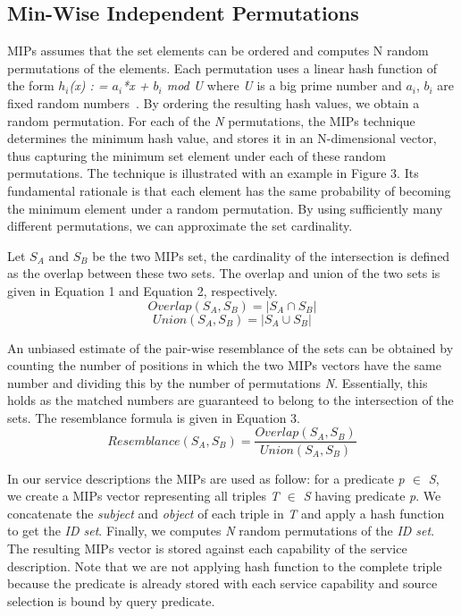\documentclass{sig-alternate}  %
\begin{document}
\subsection{Min-Wise Independent Permutations}
MIPs assumes that the set elements can
be ordered and computes N random
permutations of the elements. Each permutation uses a linear hash
function of the form  \emph{$h_i$(x) : = $a_i$*x + $b_i$ mod U} 
where \emph{U} is a big prime number and $a_i$,
$b_i$ are fixed random numbers~\cite{key-13}. By ordering the resulting
hash values, we obtain a random permutation. For each of the \emph{N} permutations,
the MIPs technique determines the minimum hash value, and stores it
in an N-dimensional vector, thus capturing the minimum set element
under each of these random permutations. The technique is illustrated
with an example in Figure 3. Its fundamental rationale
is that each element has the same probability of becoming the minimum
element under a random permutation. By using sufficiently many different
permutations, we can approximate the set cardinality.

Let $S_A$ and $S_B$ be the two MIPs set, the cardinality of the intersection is defined as the overlap between these two sets. The overlap and union of the two sets is given in Equation 1 and Equation 2, respectively. 
\begin{equation}
 Overlap(S_A,S_B)=|S_A \cap S_B|
\end{equation}
\begin{equation}
 Union(S_A,S_B)=|S_A \cup S_B|
\end{equation}

An unbiased estimate of the pair-wise resemblance of the sets can be obtained by counting the number of positions
in which the two MIPs vectors have the same number and dividing this by
the number of permutations \emph{N}. Essentially, this holds as the matched
numbers are guaranteed to belong to the intersection of the sets. The resemblance formula is given in Equation 3. 
\begin{equation}
Resemblance(S_A,S_B) = \dfrac{Overlap(S_A,S_B)}{ Union(S_A,S_B)}
\end{equation}

In our service descriptions the MIPs are used as follow: for a predicate \emph{p $\in$ S}, we create a MIPs vector representing all triples \emph{T $\in$
S} having predicate \emph{p}. We concatenate the \emph{subject}  and \emph{object} of each triple in \emph{T} and apply a hash function to get the \emph{ID set}. Finally, we computes \emph{N} random permutations of the \emph{ID set}. The resulting
MIPs vector is stored against each capability of the service description. Note that we are not applying hash function to the complete triple because the predicate is already stored with each service capability and source selection is bound by query predicate.
\end{document}
